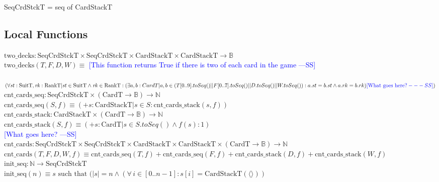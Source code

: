 \documentclass[12pt]{article}
\newcommand{\authornote}[3]{\textcolor{#1}{[#3 ---#2]}}
\newcommand{\authornote}[3]{}
\newcommand{\wss}[1]{\authornote{blue}{SS}{#1}}
\begin{document}
SeqCrdStckT = seq of CardStackT

\subsection*{Local Functions}

\noindent $\text{two\_decks} : \text{SeqCrdStckT} \times \text{SeqCrdStckT}
\times \text{CardStackT} \times \text{CardStackT} \rightarrow \mathbb{B}$\\
\noindent
$\text{two\_decks}(T, F, D, W) \equiv$ \wss{This function returns True if there
  is two of each card in the game}\\ \\
$(\forall \mathit{st}: \text{SuitT}, \mathit{rk}: 
\text{RankT} | \mathit{st} \in \text{SuitT} \wedge \mathit{rk} \in \text{RankT}:
\\ (\exists a, b : CardT | a,b \in (T[0..9].toSeq() || F[0..7].toSeq() || D.toSeq() || W.toSeq()) : a.st = b.st \wedge a.rk = b.rk) \wss{\text{What goes here?}})
$\\

\noindent $\text{cnt\_cards\_seq}: \text{SeqCrdStckT} \times (\text{CardT}
\rightarrow \mathbb{B}) \rightarrow \mathbb{N}$\\
\noindent $\text{cnt\_cards\_seq}(S, f) \equiv (+ s: \text{CardStackT} | s \in S :
\text{cnt\_cards\_stack}(s, f))$\\

\noindent $\text{cnt\_cards\_stack}: \text{CardStackT} \times (\text{CardT}
\rightarrow \mathbb{B}) \rightarrow \mathbb{N}$\\
\noindent $\text{cnt\_cards\_stack}(S, f) \equiv (+ s: \text{CardT} | s \in S.toSeq() \wedge f(s) :1)$\\
\noindent \wss{What goes here?}\\

\noindent $\text{cnt\_cards}: \text{SeqCrdStckT} \times \text{SeqCrdStckT}
\times \text{CardStackT} \times \text{CardStackT} \times (\text{CardT}
\rightarrow \mathbb{B}) \rightarrow \mathbb{N}$\\
\noindent $\text{cnt\_cards}(T, F, D, W, f) \equiv \text{cnt\_cards\_seq}(T,
f) + \text{cnt\_cards\_seq}(F, f) + \text{cnt\_cards\_stack}(D, f) +
\text{cnt\_cards\_stack}(W, f)$\\

\noindent $\text{init\_seq}: \mathbb{N} \rightarrow \text{SeqCrdStckT}$\\
\noindent $\text{init\_seq}(n) \equiv s \text{ such that } (|s| = n \land (\forall\, i
\in [0..n-1] : s[i] = \text{CardStackT}(\langle \rangle))$\\
\end{document}
